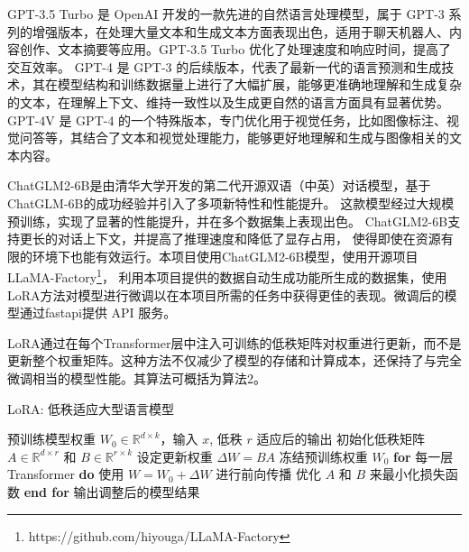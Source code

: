 \documentclass[a4paper,AutoFakeBold,oneside,12pt]{book}
\begin{document}
GPT-3.5 Turbo 是 OpenAI 开发的一款先进的自然语言处理模型，属于 GPT-3 系列的增强版本，在处理大量文本和生成文本方面表现出色，适用于聊天机器人、内容创作、文本摘要等应用。GPT-3.5 Turbo 优化了处理速度和响应时间，提高了交互效率。
GPT-4\cite{achiam2023gpt} 是 GPT-3 的后续版本，代表了最新一代的语言预测和生成技术，其在模型结构和训练数据量上进行了大幅扩展，能够更准确地理解和生成复杂的文本，在理解上下文、维持一致性以及生成更自然的语言方面具有显著优势。
GPT-4V 是 GPT-4 的一个特殊版本，专门优化用于视觉任务，比如图像标注、视觉问答等，其结合了文本和视觉处理能力，能够更好地理解和生成与图像相关的文本内容。

ChatGLM2-6B是由清华大学开发的第二代开源双语（中英）对话模型，基于ChatGLM-6B的成功经验并引入了多项新特性和性能提升。
这款模型经过大规模预训练，实现了显著的性能提升，并在多个数据集上表现出色。
ChatGLM2-6B支持更长的对话上下文，并提高了推理速度和降低了显存占用，
使得即使在资源有限的环境下也能有效运行。本项目使用ChatGLM2-6B模型，使用开源项目LLaMA-Factory\footnote{https://github.com/hiyouga/LLaMA-Factory}，
利用本项目提供的数据自动生成功能所生成的数据集，使用LoRA\cite{hu2021lora}方法对模型进行微调以在本项目所需的任务中获得更佳的表现。微调后的模型通过fastapi提供 API 服务。

LoRA通过在每个Transformer层中注入可训练的低秩矩阵对权重进行更新，而不是更新整个权重矩阵。这种方法不仅减少了模型的存储和计算成本，还保持了与完全微调相当的模型性能。其算法可概括为算法2。
\begin{algorithm}
    \begin{spacing}{1.3}
        \caption{LoRA: 低秩适应大型语言模型} 
        \label{alg:LoRA}
        \renewcommand{\algorithmicrequire}{\textbf{输入：}}
        \renewcommand{\algorithmicensure}{\textbf{输出：}} 
        \begin{algorithmic}[1] 
            \Require 预训练模型权重 $W_0 \in \mathbb{R}^{d \times k}$，输入 $x$, 低秩 $r$
            \Ensure 适应后的输出
            \State 初始化低秩矩阵 $A \in \mathbb{R}^{d \times r}$ 和 $B \in \mathbb{R}^{r \times k}$
            \State 设定更新权重 $\Delta W = BA$
            \State 冻结预训练权重 $W_0$
            \State \textbf{for} 每一层Transformer \textbf{do}
            \State \hspace{\algorithmicindent} 使用 $W = W_0 + \Delta W$ 进行前向传播
            \State \hspace{\algorithmicindent} 优化 $A$ 和 $B$ 来最小化损失函数
            \State \textbf{end for}
            \State 输出调整后的模型结果
        \end{algorithmic}
    \end{spacing}
\end{algorithm}
\end{document}
